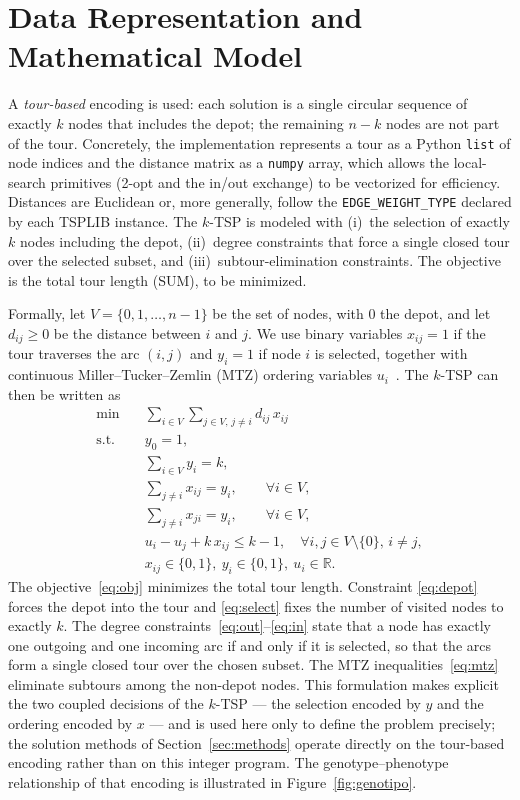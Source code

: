 \documentclass[12pt,a4paper,oneside]{report}
\begin{document}
\section{Data Representation and Mathematical Model}
A \emph{tour-based} encoding is used: each solution is a single circular sequence
of exactly $k$ nodes that includes the depot; the remaining $n-k$ nodes are not
part of the tour. Concretely, the implementation represents a tour as a Python
\texttt{list} of node indices and the distance matrix as a \texttt{numpy} array,
which allows the local-search primitives (2-opt and the in/out exchange) to be
vectorized for efficiency. Distances are Euclidean or, more generally, follow the
\texttt{EDGE\_WEIGHT\_TYPE} declared by each TSPLIB instance. The $k$-TSP is
modeled with (i)~the selection of exactly $k$ nodes including the depot,
(ii)~degree constraints that force a single closed tour over the selected subset,
and (iii)~subtour-elimination constraints. The objective is the total tour length
(SUM), to be minimized.

Formally, let $V=\{0,1,\dots,n-1\}$ be the set of nodes, with $0$ the depot, and
let $d_{ij}\ge 0$ be the distance between $i$ and $j$. We use binary variables
$x_{ij}=1$ if the tour traverses the arc $(i,j)$ and $y_i=1$ if node $i$ is
selected, together with continuous Miller--Tucker--Zemlin (MTZ) ordering variables
$u_i$~\cite{miller1960mtz}. The $k$-TSP can then be written as
\begin{align}
\min\quad & \sum_{i\in V}\sum_{j\in V,\,j\neq i} d_{ij}\,x_{ij} \label{eq:obj}\\
\text{s.t.}\quad
& y_0 = 1, \label{eq:depot}\\
& \sum_{i\in V} y_i = k, \label{eq:select}\\
& \sum_{j\neq i} x_{ij} = y_i, \qquad \forall i\in V, \label{eq:out}\\
& \sum_{j\neq i} x_{ji} = y_i, \qquad \forall i\in V, \label{eq:in}\\
& u_i - u_j + k\,x_{ij} \le k-1, \quad \forall i,j\in V\setminus\{0\},\, i\neq j, \label{eq:mtz}\\
& x_{ij}\in\{0,1\},\ y_i\in\{0,1\},\ u_i\in\mathbb{R}. \label{eq:dom}
\end{align}
The objective~\eqref{eq:obj} minimizes the total tour length. Constraint
\eqref{eq:depot} forces the depot into the tour and \eqref{eq:select} fixes the
number of visited nodes to exactly $k$. The degree
constraints~\eqref{eq:out}--\eqref{eq:in} state that a node has exactly one
outgoing and one incoming arc if and only if it is selected, so that the arcs form
a single closed tour over the chosen subset. The MTZ
inequalities~\eqref{eq:mtz} eliminate subtours among the non-depot nodes. This
formulation makes explicit the two coupled decisions of the $k$-TSP --- the
selection encoded by $y$ and the ordering encoded by $x$ --- and is used here only
to define the problem precisely; the solution methods of Section~\ref{sec:methods}
operate directly on the tour-based encoding rather than on this integer program.
The genotype--phenotype relationship of that encoding is illustrated in
Figure~\ref{fig:genotipo}.
\end{document}
